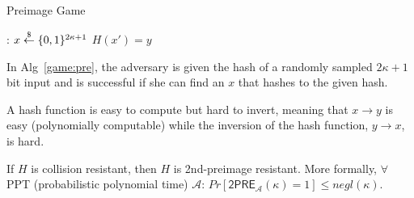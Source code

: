 \begin{algorithm}[H]
\caption{Preimage Game}
\label{game:pre}
\begin{algorithmic}[1]
:
    \State $x \overset{\$}{\gets} \{0,1\}^{2\kappa+1}$
    \State \Return $H(x') = y$
\EndFunction
\end{algorithmic}
\end{algorithm}

In Alg~\ref{game:pre}, the adversary is given the hash of a randomly sampled $2\kappa+1$ bit input and is successful if she can find an $x$ that hashes to the given hash.

A hash function is easy to compute but hard to invert, meaning that $x \rightarrow y$ is easy (polynomially computable) while the inversion of the hash function, $y \rightarrow x$, is hard.

\begin{theorem}
If $H$ is collision resistant, then $H$ is 2nd-preimage resistant. More formally, $\forall$ PPT (probabilistic polynomial time) $\mathcal{A}$: $Pr[\mathsf{2PRE}_{\mathcal{A}}(\kappa) = 1] \leq
negl(\kappa).$
\end{theorem}

